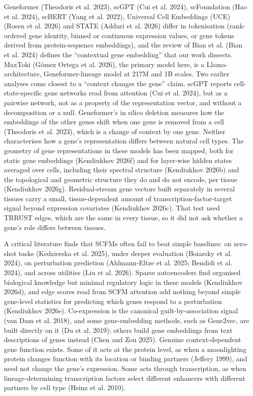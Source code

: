\documentclass[
  11pt,
]{article}
\begin{document}
Geneformer (Theodoris et al. 2023), scGPT (Cui et al. 2024),
scFoundation (Hao et al. 2024), scBERT (Yang et al. 2022), Universal
Cell Embeddings (UCE) (Rosen et al. 2026) and STATE ({Adduri et al.}
2026) differ in tokenisation (rank-ordered gene identity, binned or
continuous expression values, or gene tokens derived from
protein-sequence embeddings), and the review of Bian et al. (Bian et al.
2024) defines the ``contextual gene embedding'' that our work dissects.
MaxToki ({Gómez Ortega et al.} 2026), the primary model here, is a
Llama-architecture, Geneformer-lineage model at 217M and 1B scales. Two
earlier analyses come closest to a ``context changes the gene'' claim.
scGPT reports cell-state-specific gene networks read from attention (Cui
et al. 2024), but as a pairwise network, not as a property of the
representation vector, and without a decomposition or a null.
Geneformer's in silico deletion measures how the embeddings of the other
genes shift when one gene is removed from a cell (Theodoris et al.
2023), which is a change of context by one gene. Neither characterises
how a gene's representation differs between natural cell types. The
geometry of gene representations in these models has been mapped, both
for static gene embeddings (Kendiukhov 2026f) and for layer-wise hidden
states averaged over cells, including their spectral structure
(Kendiukhov 2026b) and the topological and geometric structure they do
and do not encode, per tissue (Kendiukhov 2026g). Residual-stream gene
vectors built separately in several tissues carry a small,
tissue-dependent amount of transcription-factor-target signal beyond
expression covariates (Kendiukhov 2026c). That test used TRRUST edges,
which are the same in every tissue, so it did not ask whether a gene's
role differs between tissues.

A critical literature finds that SCFMs often fail to beat simple
baselines: on zero-shot tasks (Kedzierska et al. 2025), under deeper
evaluation (Boiarsky et al. 2024), on perturbation prediction
(Ahlmann-Eltze et al. 2025; Bendidi et al. 2024), and across utilities
(Liu et al. 2026). Sparse autoencoders find organised biological
knowledge but minimal regulatory logic in these models (Kendiukhov
2026d), and edge scores read from SCFM attention add nothing beyond
simple gene-level statistics for predicting which genes respond to a
perturbation (Kendiukhov 2026e). Co-expression is the canonical
guilt-by-association signal ({van Dam et al.} 2018), and some
gene-embedding methods, such as Gene2vec, are built directly on it (Du
et al. 2019); others build gene embeddings from text descriptions of
genes instead (Chen and Zou 2025). Genuine context-dependent gene
function exists. Some of it acts at the protein level, as when a
moonlighting protein changes function with its location or binding
partners (Jeffery 1999), and need not change the gene's expression. Some
acts through transcription, as when lineage-determining transcription
factors select different enhancers with different partners by cell type
(Heinz et al. 2010).
\end{document}
